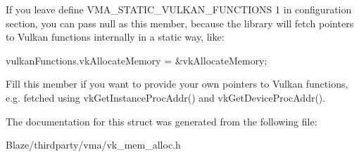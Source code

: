 If you leave define {\ttfamily V\+M\+A\+\_\+\+S\+T\+A\+T\+I\+C\+\_\+\+V\+U\+L\+K\+A\+N\+\_\+\+F\+U\+N\+C\+T\+I\+O\+NS 1} in configuration section, you can pass null as this member, because the library will fetch pointers to Vulkan functions internally in a static way, like\+: \begin{DoxyVerb}vulkanFunctions.vkAllocateMemory = &vkAllocateMemory;
\end{DoxyVerb}


Fill this member if you want to provide your own pointers to Vulkan functions, e.\+g. fetched using {\ttfamily vk\+Get\+Instance\+Proc\+Addr()} and {\ttfamily vk\+Get\+Device\+Proc\+Addr()}. 

The documentation for this struct was generated from the following file\+:\begin{DoxyCompactItemize}
\item 
Blaze/thirdparty/vma/vk\+\_\+mem\+\_\+alloc.\+h\end{DoxyCompactItemize}
